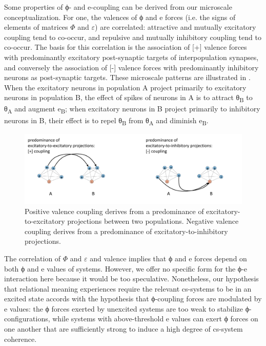 

  Some properties of ϕ- and e-coupling can be derived from our microscale conceptualization. For one, the valences of ϕ and e forces (i.e. the signs of elements of matrices $\Phi$ and $\varepsilon $) are correlated: attractive and mutually excitatory coupling tend to co-occur, and repulsive and mutually inhibitory coupling tend to co-occur. The basis for this correlation is the association of [+] valence forces with predominantly excitatory post-synaptic targets of interpopulation synapses, and conversely the association of [-] valence forces with predominantly inhibitory neurons as post-synaptic targets. These microscale patterns are illustrated in {}. When the excitatory neurons in population A project primarily to excitatory neurons in population B, the effect of spikes of neurons in A is to attract θ\textsubscript{B} to θ\textsubscript{A} and augment e\textsubscript{B}; when excitatory neurons in B project primarily to inhibitory neurons in B, their effect is to repel θ\textsubscript{B} from θ\textsubscript{A} and diminish e\textsubscript{B}. 

  
\begin{figure}
\includegraphics[width=\textwidth]{figures/Tilsen-img21.png}
\caption{Positive valence coupling derives from a predominance of excitatory-to-excitatory projections between two populations. Negative valence coupling derives from a predominance of excitatory-to-inhibitory projections.}
\label{fig:2:14}
\end{figure}
 

  The correlation of $\Phi$ and $\varepsilon $ and valence implies that ϕ and e forces depend on both ϕ and e values of systems. However, we offer no specific form for the ϕ-e interaction here because it would be too speculative. Nonetheless, our hypothesis that relational meaning experiences require the relevant cs-systems to be in an excited state accords with the hypothesis that ϕ-coupling forces are modulated by e values: the ϕ forces exerted by unexcited systems are too weak to stabilize ϕ-configurations, while systems with above-threshold e values can exert ϕ forces on one another that are sufficiently strong to induce a high degree of cs-system coherence.

